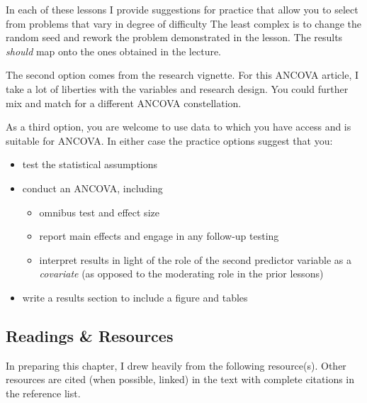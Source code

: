 \documentclass[
  11pt,
]{book}
\providecommand{\tightlist}{%
  \setlength{\itemsep}{0pt}\setlength{\parskip}{0pt}}
\begin{document}
In each of these lessons I provide suggestions for practice that allow you to select from problems that vary in degree of difficulty The least complex is to change the random seed and rework the problem demonstrated in the lesson. The results \emph{should} map onto the ones obtained in the lecture.

The second option comes from the research vignette. For this ANCOVA article, I take a lot of liberties with the variables and research design. You could further mix and match for a different ANCOVA constellation.

As a third option, you are welcome to use data to which you have access and is suitable for ANCOVA. In either case the practice options suggest that you:

\begin{itemize}
\tightlist
\item
  test the statistical assumptions
\item
  conduct an ANCOVA, including

  \begin{itemize}
  \tightlist
  \item
    omnibus test and effect size
  \item
    report main effects and engage in any follow-up testing
  \item
    interpret results in light of the role of the second predictor variable as a \emph{covariate} (as opposed to the moderating role in the prior lessons)
  \end{itemize}
\item
  write a results section to include a figure and tables
\end{itemize}

\hypertarget{readings-resources-8}{%
\subsection{Readings \& Resources}\label{readings-resources-8}}

In preparing this chapter, I drew heavily from the following resource(s). Other resources are cited (when possible, linked) in the text with complete citations in the reference list.
\end{document}

